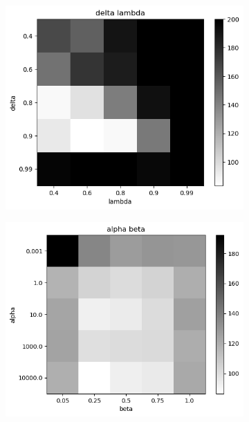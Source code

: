\documentclass{article}
\begin{document}
\begin{figure}[h]
	\centering
	\begin{subfigure}[t]{0.28\linewidth}
		\centering
		\includegraphics[width = 1.0\linewidth, trim={0 0 0 20}, clip=true]{figures/real_delta_lambda_heat.png}
		\label{fig:delta_lambda}	
	\end{subfigure}%
	\hspace{0.05\linewidth}
	\begin{subfigure}[t]{0.28\linewidth}
		\centering
		\includegraphics[width = 1.0\linewidth, trim={0 0 0 20}, clip=true]{figures/test_alpha_beta_heat.png}

\end{subfigure}
\end{figure}
\end{document}
